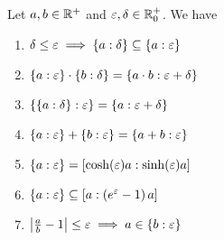 \begin{theorem} \label{thm:multiplicative:rules}
  Let $a,b\in \Rplus$ and $\epsilon,\delta \in\Rplusnull$. We have

  \begin{enumerate}
    \item $\delta \le \epsilon \implies \ean[\delta]{a} \subseteq \ean[\epsilon]{a}$ 
    \item $\ean[\epsilon]{a} \cdot \ean[\delta]{b} = \ean[\epsilon+\delta]{a\cdot b}$
    \item $\ean[\epsilon]{\ean[\delta]{a}} = \ean[\epsilon+\delta]{a}$
    \item $\ean[\epsilon]{a} + \ean[\epsilon]{b} = \ean[\epsilon]{a+b}$
    \item $\ean[\epsilon]{a} = \an[\sinh(\epsilon)a]{\cosh(\epsilon)a}$
    \item $\ean[\epsilon]{a} \subseteq \an[\left(e^\epsilon-1\right)a]{a}$
    \item $\abs{\frac ab-1} \le \epsilon \implies a\in\ean[\epsilon]{b}$
  \end{enumerate}
\end{theorem}

